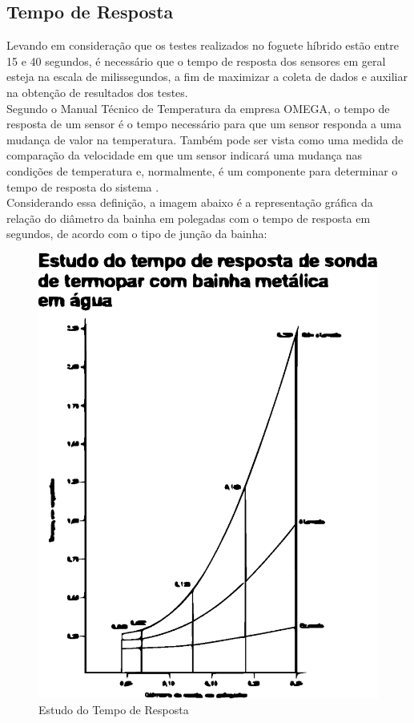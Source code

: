 \subsection{Tempo de Resposta}
Levando em consideração que os testes realizados no foguete híbrido estão entre 15 e 40 segundos, é necessário que o tempo de resposta dos sensores em geral esteja na escala de milissegundos, a fim de maximizar a coleta de dados e auxiliar na obtenção de resultados dos testes.\\
Segundo o Manual Técnico de Temperatura da empresa OMEGA, o tempo de resposta de um sensor é o tempo necessário para que um sensor responda a uma mudança de valor na temperatura. Também pode ser vista como uma medida de comparação da velocidade em que um sensor indicará uma mudança nas condições de temperatura e, normalmente, é um componente para determinar o tempo de resposta do sistema .\\
Considerando essa definição, a imagem abaixo é a representação gráfica da relação do diâmetro da bainha em polegadas com o tempo de resposta em segundos, de acordo com o tipo de junção da bainha:
\begin{figure}[!htb]                   
	\centering                          
	\includegraphics[scale=1]{figuras/Figura3.eps}
	\caption{Estudo do Tempo de Resposta}               
\end{figure}	
